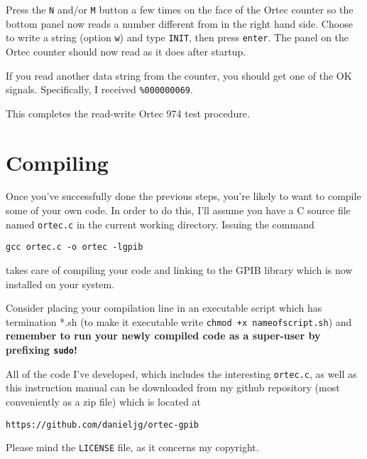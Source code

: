 \documentclass[letterpaper,11pt]{article}
\begin{document}
Press the \texttt{N} and/or \texttt{M} button a few times on the face of the Ortec counter so the bottom panel now reads a number different from  in the right hand side. Choose to write a string (option \texttt{w}) and type \texttt{INIT}, then press \texttt{enter}. The panel on the Ortec counter should now read  as it does after startup.

If you read another data string from the counter, you should get one of the OK signals. Specifically, I received \texttt{\%000000069}.

This completes the read-write Ortec 974 test procedure.

\section{Compiling}

Once you've successfully done the previous steps, you're likely to want to compile some of your own code. In order to do this, I'll assume you have a C source file named \texttt{ortec.c} in the current working directory. Issuing the command
\begin{verbatim}
gcc ortec.c -o ortec -lgpib
\end{verbatim}
takes care of compiling your code and linking to the GPIB library which is now installed on your system.

Consider placing your compilation line in an executable script which has termination *.sh (to make it executable write \texttt{chmod +x nameofscript.sh}) and \textbf{remember to run your newly compiled code as a super-user by prefixing \texttt{sudo}!}

All of the code I've developed, which includes the interesting \texttt{ortec.c}, as well as this instruction manual can be downloaded from my github repository (most conveniently as a zip file) which is located at
\begin{verbatim}
https://github.com/danieljg/ortec-gpib
\end{verbatim}
Please mind the \texttt{LICENSE} file, as it concerns my copyright.
\end{document}
